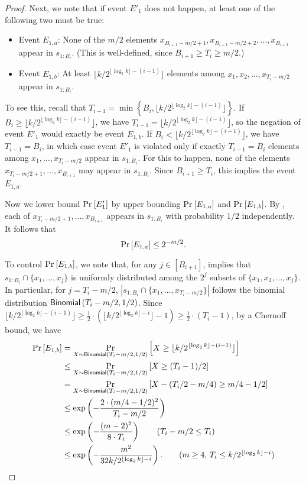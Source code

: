 \begin{proof}
Next, we note that if event $E'_1$ does not happen, at least one of the following two must be true:
\begin{itemize}
    \item Event $E_{1, a}$: None of the $m/2$ elements $x_{B_{i+1} - m/2 + 1}, x_{B_{i+1} - m/2 + 2}, \ldots, x_{B_{i+1}}$ appear in $s_{1:B_i}$. (This is well-defined, since $B_{i+1} \ge T_i \ge m/2$.)
    \item Event $E_{1, b}$: At least $\lfloor k / 2^{\lfloor \log_2 k\rfloor - (i-1)} \rfloor$ elements among $x_1, x_2, \ldots, x_{T_i - m /2}$ appear in $s_{1:B_i}$.
\end{itemize}
To see this, recall that $T_{i-1} = \min\left\{B_i, \lfloor k/2^{\lfloor\log_2 k\rfloor - (i-1)}\rfloor\right\}$. If $B_i \ge \lfloor k/2^{\lfloor\log_2 k\rfloor - (i-1)}\rfloor$, we have $T_{i-1} = \lfloor k / 2^{\lfloor \log_2 k\rfloor - (i-1)} \rfloor$, so the negation of event $E'_1$ would exactly be event $E_{1,b}$. If $B_{i} < \lfloor k/2^{\lfloor\log_2 k\rfloor - (i-1)}\rfloor$, we have $T_{i-1} = B_i$, in which case event $E'_1$ is violated only if exactly $T_{i-1} = B_i$ elements among $x_1, \ldots, x_{T_i - m/2}$ appear in $s_{1:B_i}$. For this to happen, none of the elements $x_{T_i - m/2 + 1}, \ldots, x_{B_{i+1}}$ may appear in $s_{1:B_i}$. Since $B_{i+1} \ge T_i$, this implies the event $E_{1,a}$.

Now we lower bound $\Pr_{}\left[E'_1\right]$ by upper bounding $\Pr_{}\left[E_{1,a}\right]$ and $\Pr_{}\left[E_{1,b}\right]$. By , each of $x_{T_i - m/2+1}, \ldots, x_{B_{i+1}}$ appears in $s_{1:B_i}$ with probability $1/2$ independently. It follows that
\[
    \Pr_{}\left[E_{1,a}\right] \le 2^{-m/2}.
\]
To control $\Pr_{}\left[E_{1,b}\right]$, we note that, for any $j \in [B_{i+1}]$,  implies that $s_{1:B_i} \cap \{x_1, \ldots , x_j\}$ is uniformly distributed among the $2^{j}$ subsets of $\{x_1, x_2, \ldots, x_j\}$. In particular, for $j = T_i - m / 2$, $\left|s_{1:B_i} \cap \{x_1, \ldots, x_{T_{i}-m/2}\}\right|$ follows the binomial distribution $\mathsf{Binomial}\left(T_{i}-m/2, 1/2\right)$. Since $\lfloor k/2^{\lfloor\log_2 k\rfloor - (i-1)}\rfloor \ge \frac{1}{2}\cdot (\lfloor k/2^{\lfloor\log_2 k\rfloor - i}\rfloor-1) \ge \frac{1}{2}\cdot (T_i-1)$, by a Chernoff bound, we have
\begin{align*}
    \pr{}{E_{1,b}}
&=  \pr{X \sim \Binomial(T_i - m/2, 1/2)}{X \ge \lfloor k / 2^{\lfloor \log_2 k\rfloor - (i-1)}\rfloor}\\
&\le\pr{X \sim \Binomial(T_i - m/2, 1/2)}{X \ge (T_i-1) / 2}\\
&=  \pr{X \sim \Binomial(T_i - m/2, 1/2)}{X - \left(T_i / 2 - m / 4\right) \ge m / 4 - 1/2}\\
&\le\exp\left(-\frac{2\cdot(m / 4 - 1/2)^2}{T_i - m/2}\right)\\
&\le \exp\left(-\frac{(m-2)^2}{8\cdot T_{i}}\right) \tag{$T_i - m / 2 \le T_i$} \\
&\le \exp\left(-\frac{m^2}{32k/2^{\lfloor\log_2k\rfloor-i}}\right). \tag{$m \ge 4$, $T_i \le k/2^{\lfloor\log_2k\rfloor-i}$}
\end{align*}


\end{proof}
